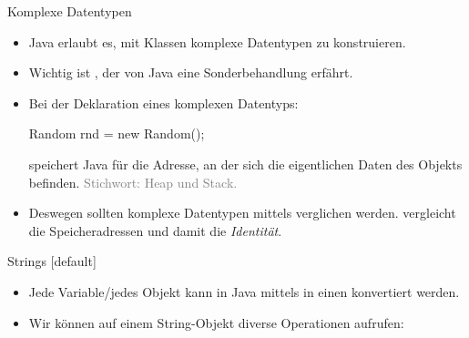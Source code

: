 \begin{frame}[fragile]{Komplexe Datentypen}
    \begin{itemize}[<+(1)->]
        \widei
        \item Java erlaubt es, mit Klassen komplexe Datentypen zu konstruieren.
        \item Wichtig ist , der von Java eine Sonderbehandlung erfährt.
        \item Bei der Deklaration eines komplexen Datentyps:\pause{}
\begin{plainjava}
Random rnd = new Random();
\end{plainjava}
        \pause{}speichert Java für  die Adresse,\pause{} an der sich die eigentlichen Daten des Objekts befinden. \textcolor{gray}{Stichwort: Heap und Stack.}
        \item Deswegen sollten komplexe Datentypen mittels  verglichen werden.\pause{} \bjava{==} vergleicht die Speicheradressen und damit die \emph{Identität}.
    \end{itemize}
\end{frame}

\begin{frame}{Strings}
    [default]%
    \begin{itemize}[<+(1)->]
        \widei
        \item Jede Variable/jedes Objekt kann in Java mittels  in einen  konvertiert werden.
        \item Wir können auf einem String-Objekt diverse Operationen aufrufen: 
    \end{itemize}
\end{frame}

